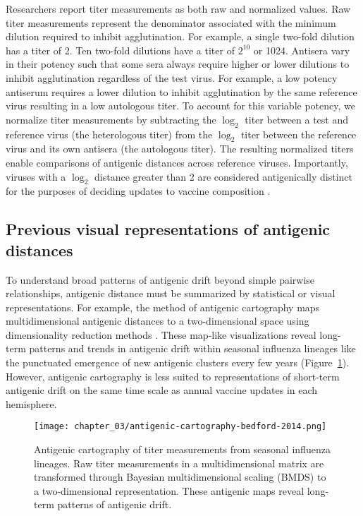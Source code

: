 Researchers report titer measurements as both raw and normalized values.
Raw titer measurements represent the denominator associated with the minimum dilution required to inhibit agglutination.
For example, a single two-fold dilution has a titer of 2.
Ten two-fold dilutions have a titer of $2^{10}$ or 1024.
Antisera vary in their potency such that some sera always require higher or lower dilutions to inhibit agglutination regardless of the test virus.
For example, a low potency antiserum requires a lower dilution to inhibit agglutination by the same reference virus resulting in a low autologous titer.
To account for this variable potency, we normalize titer measurements by subtracting the $\log_{2}$ titer between a test and reference virus (the heterologous titer) from the $\log_{2}$ titer between the reference virus and its own antisera (the autologous titer).
The resulting normalized titers enable comparisons of antigenic distances across reference viruses.
Importantly, viruses with a $\log_{2}$ distance greater than 2 are considered antigenically distinct for the purposes of deciding updates to vaccine composition \citep{}.

\subsection{Previous visual representations of antigenic distances}

To understand broad patterns of antigenic drift beyond simple pairwise relationships, antigenic distance must be summarized by statistical or visual representations.
For example, the method of antigenic cartography maps multidimensional antigenic distances to a two-dimensional space using dimensionality reduction methods \citep{Smith:2004jc,Bedford:2014bf}.
These map-like visualizations reveal long-term patterns and trends in antigenic drift within seasonal influenza lineages like the punctuated emergence of new antigenic clusters every few years (Figure~\ref{fig:antigenic-cartography-bedford-2014}).
However, antigenic cartography is less suited to representations of short-term antigenic drift on the same time scale as annual vaccine updates in each hemisphere.

\begin{figure}
  \centering
  \texttt{[image: chapter\_03/antigenic-cartography-bedford-2014.png]}
  \caption{\label{fig:antigenic-cartography-bedford-2014} Antigenic cartography of titer measurements from seasonal influenza lineages.
    Raw titer measurements in a multidimensional matrix are transformed through Bayesian multidimensional scaling (BMDS) to a two-dimensional representation.
    These antigenic maps reveal long-term patterns of antigenic drift.}
\end{figure}

